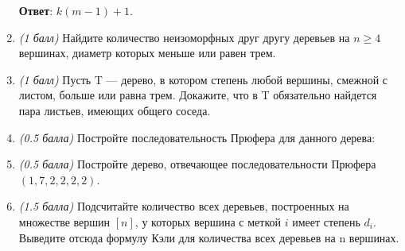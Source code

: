 \documentclass{article}
\begin{document}
\begin{enumerate}
    \textbf{Ответ}: $k(m-1)+1$.

    \item \textit{(1 балл)} Найдите количество неизоморфных друг другу деревьев на $n \geq 4$ вершинах, диаметр которых меньше или равен трем.
    \item \textit{(1 балл)} Пусть T — дерево, в котором степень любой вершины, смежной с листом, больше или равна трем. Докажите, что в T обязательно найдется пара листьев, имеющих общего соседа.
    \item \textit{(0.5 балла)} Постройте последовательность Прюфера для данного дерева:
    \item \textit{(0.5 балла)} Постройте дерево, отвечающее последовательности Прюфера $(1, 7, 2, 2, 2, 2)$.
    \item \textit{(1.5 балла)} Подсчитайте количество всех деревьев, построенных на множестве вершин $[n]$, у которых вершина с меткой $i$ имеет степень $d_i$. Выведите отсюда формулу Кэли для количества всех деревьев на n вершинах.
\end{enumerate}
\end{document}

